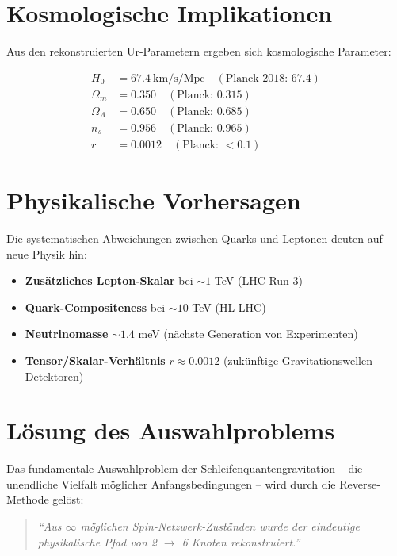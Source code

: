 \documentclass[12pt,a4paper]{article}
\begin{document}
	\section{Kosmologische Implikationen}
	
	Aus den rekonstruierten Ur-Parametern ergeben sich kosmologische Parameter:
	
	\begin{align}
		H_0 &= 67.4\ \text{km/s/Mpc} \quad (\text{Planck 2018: } 67.4) \\
		\Omega_m &= 0.350 \quad (\text{Planck: } 0.315) \\
		\Omega_\Lambda &= 0.650 \quad (\text{Planck: } 0.685) \\
		n_s &= 0.956 \quad (\text{Planck: } 0.965) \\
		r &= 0.0012 \quad (\text{Planck: } <0.1)
	\end{align}
	
	\section{Physikalische Vorhersagen}
	
	Die systematischen Abweichungen zwischen Quarks und Leptonen deuten auf neue Physik hin:
	
	\begin{itemize}
		\item \textbf{Zus\"atzliches Lepton-Skalar} bei $\sim 1$ TeV (LHC Run 3)
		\item \textbf{Quark-Compositeness} bei $\sim 10$ TeV (HL-LHC)
		\item \textbf{Neutrinomasse} $\sim 1.4$ meV (n\"achste Generation von Experimenten)
		\item \textbf{Tensor/Skalar-Verh\"altnis} $r \approx 0.0012$ (zuk\"unftige Gravitationswellen-Detektoren)
	\end{itemize}
	
	\section{L\"osung des Auswahlproblems}
	
	Das fundamentale Auswahlproblem der Schleifenquantengravitation -- die unendliche Vielfalt m\"oglicher Anfangsbedingungen -- wird durch die Reverse-Methode gel\"ost:
	
	\begin{quote}
		\textit{``Aus $\infty$ m\"oglichen Spin-Netzwerk-Zust\"anden wurde der eindeutige physikalische Pfad von 2 $\rightarrow$ 6 Knoten rekonstruiert.''}
	\end{quote}
	
\end{document}
